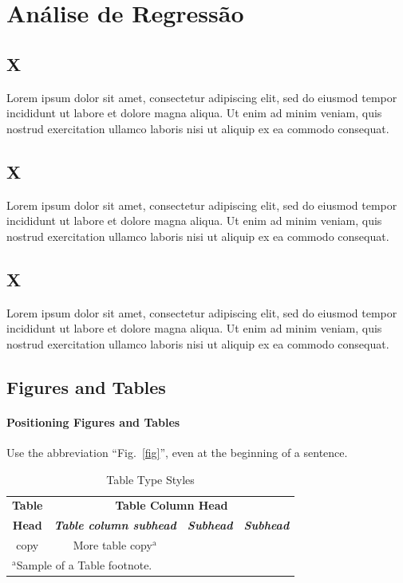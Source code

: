 \documentclass[conference]{IEEEtran}
\begin{document}
\section{Análise de Regressão} %

\subsection{X}
Lorem ipsum dolor sit amet, consectetur adipiscing elit, sed do eiusmod tempor incididunt ut labore et dolore magna aliqua. Ut enim ad minim veniam, quis nostrud exercitation ullamco laboris nisi ut aliquip ex ea commodo consequat.

\subsection{X}
Lorem ipsum dolor sit amet, consectetur adipiscing elit, sed do eiusmod tempor incididunt ut labore et dolore magna aliqua. Ut enim ad minim veniam, quis nostrud exercitation ullamco laboris nisi ut aliquip ex ea commodo consequat.

\subsection{X}
Lorem ipsum dolor sit amet, consectetur adipiscing elit, sed do eiusmod tempor incididunt ut labore et dolore magna aliqua. Ut enim ad minim veniam, quis nostrud exercitation ullamco laboris nisi ut aliquip ex ea commodo consequat.

\subsection{Figures and Tables}
\paragraph{Positioning Figures and Tables} 
Use the abbreviation 
``Fig.~\ref{fig}'', even at the beginning of a sentence.

\begin{table}[htbp]
\caption{Table Type Styles}
\begin{center}
\begin{tabular}{|c|c|c|c|}
\hline
\textbf{Table}&\multicolumn{3}{|c|}{\textbf{Table Column Head}} \\
\cline{2-4} 
\textbf{Head} & \textbf{\textit{Table column subhead}}& \textbf{\textit{Subhead}}& \textbf{\textit{Subhead}} \\
\hline
copy& More table copy$^{\mathrm{a}}$& &  \\
\hline
\multicolumn{4}{l}{$^{\mathrm{a}}$Sample of a Table footnote.}
\end{tabular}
\label{tab1}
\end{center}
\end{table}
\end{document}

